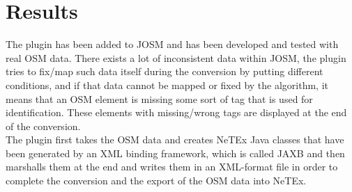\section*{Results}
The plugin has been added to JOSM and has been developed and tested with real OSM data. There exists a lot of inconsistent data within JOSM, the plugin tries to fix/map such data itself during the conversion by putting different conditions, and if that data cannot be mapped or fixed by the algorithm, it means that an OSM element is missing some sort of tag that is used for identification. These elements with missing/wrong tags are displayed at the end of the conversion.\\
The plugin first takes the OSM data and creates NeTEx Java classes that have been generated by an XML binding framework, which is called JAXB and then marshalls them at the end and writes them in an XML-format file in order to complete the conversion and the export of the OSM data into NeTEx.
